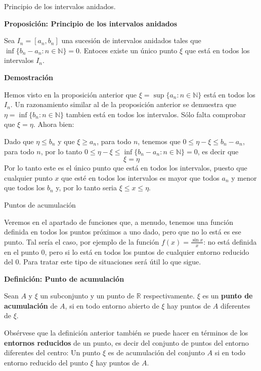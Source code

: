 \documentclass[ignorenonframetext,]{beamer}
\begin{document}
\begin{frame}{Principio de los intervalos anidados.}
\protect\hypertarget{principio-de-los-intervalos-anidados.}{}

 \textbf{Proposición: Principio de los intervalos anidados}

Sea \(I_n = [a_n,b_n]\) una sucesión de intervalos anidados tales que
\(\inf\{b_n-a_n: n \in \mathbb{N}\}=0\). Entoces existe un único punto
\(\xi\) que está en todos los intervalos \(I_n\).

\textbf{Demostración}

Hemos visto en la proposición anterior que
\(\xi = \sup\{a_n: n \in \mathbb{N} \}\) está en todos los \(I_n\). Un
razonamiento similar al de la proposición anterior se demuestra que
\(\eta = \inf \{b_n: n \in \mathbb{N} \}\) tambien está en todos los
intervalos. Sólo falta comprobar que \(\xi = \eta\). Ahora bien:

Dado que \(\eta \leq b_n\) y que \(\xi\geq a_n\), para todo \(n\),
tenemos que \(0 \leq \eta - \xi \leq b_n -a_n\), para todo \(n\), por lo
tanto \(0 \leq \eta - \xi \leq \inf\{b_n-a_n: n \in \mathbb{N}\}=0\), es
decir que \[
\xi = \eta
\] Por lo tanto este es el único punto que está en todos los intervalos,
puesto que cualquier punto \(x\) que esté en todos los intervalos es
mayor que todos \(a_n\) y menor que todos los \(b_n\) y, por lo tanto
seria \(\xi \leq x \leq \eta\).

\end{frame}

\begin{frame}{Puntos de acumulación}
\protect\hypertarget{puntos-de-acumulaciuxf3n}{}

Veremos en el apartado de funciones que, a menudo, tenemos una función
definida en todos los puntos próximos a uno dado, pero que no lo está es
ese punto. Tal sería el caso, por ejemplo de la función
\(f(x)= \frac{\sin x}{x}\): no está definida en el punto \(0\), pero si
lo está en todos los puntos de cualquier entorno reducido del \(0\).
Para tratar este tipo de situaciones será útil lo que sigue.

 \textbf{Definición: Punto de acumulación}

Sean \(A\) y \(\xi\) un subconjunto y un punto de \(\mathbb{R}\)
respectivamente. \(\xi\) es un \textbf{punto de acumulación} de \(A\),
si en todo entorno abierto de \(\xi\) hay puntos de \(A\) diferentes de
\(\xi\).

Obsérvese que la definición anterior también se puede hacer en términos
de los \textbf{entornos reducidos} de un punto, es decir del conjunto de
puntos del entorno diferentes del centro: Un punto \(\xi\) es de
acumulación del conjunto \(A\) si en todo entorno reducido del punto
\(\xi\) hay puntos de \(A\).

\end{frame}
\end{document}
